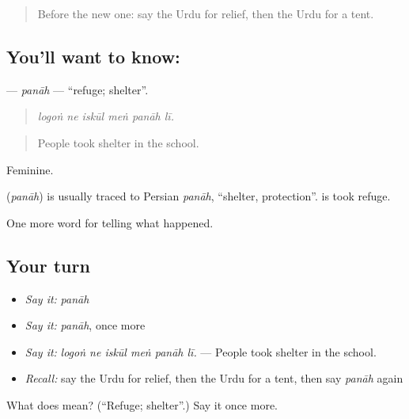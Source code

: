 \begin{quote}
Before the new one: say the Urdu for relief, then the Urdu for a tent.
\end{quote}

\subsection*{You'll want to know: }
\textbf{} — \emph{panāh} — \textquotedblleft{}refuge; shelter\textquotedblright{}.

\begin{quote}
     
\end{quote}

\begin{quote}
\emph{logoṅ ne iskūl meṅ panāh lī.}
\end{quote}

\begin{quote}
People took shelter in the school.
\end{quote}

Feminine.

\begin{cousinweb}
\textbf{} (\emph{panāh}) is usually traced to Persian \emph{panāh}, \textquotedblleft{}shelter, protection\textquotedblright{}. \textbf{ } is took refuge.
\end{cousinweb}

\begin{grammarlens}[title={What you've built}]
One more word for telling what happened.
\end{grammarlens}

\subsection*{Your turn}
\begin{itemize}
\raggedright
  \item \emph{Say it:} \emph{panāh}
  \item \emph{Say it:} \emph{panāh}, once more
  \item \emph{Say it:} \emph{logoṅ ne iskūl meṅ panāh lī.} — People took shelter in the school.
  \item \emph{Recall:} say the Urdu for relief, then the Urdu for a tent, then say \emph{panāh} again
\end{itemize}

\begin{tcolorbox}[breakable,colback=teal!4,colframe=teal!35!black,title={Before you move on}]
What does  mean? (\textquotedblleft{}Refuge; shelter\textquotedblright{}.) Say it once more.
\end{tcolorbox}
